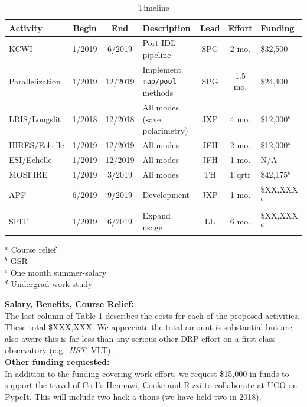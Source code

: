 \documentclass[12pt,preprint]{aastex}
\begin{document}
{\footnotesize

\begin{table}[ht]
\begin{center}
\caption{Timeline \label{tab:timeline}}
\end{center}
\begin{tabular}{lcclccl}
\hline 
Activity & Begin & End & Description & Lead & Effort & Funding \\
\hline 
KCWI & 1/2019 & 6/2019 & Port IDL pipeline & SPG & 2 mo. & \$32,500 \\
%
%
Parallelization & 1/2019 & 12/2019 & Implement {\tt map/pool} methods & SPG & 1.5 mo. & \$24,400 \\
LRIS/Longslit & 1/2018 & 12/2018 & All modes (save polarimetry) & JXP & 4 mo. & 
\$12,000$^a$ \\
HIRES/Echelle & 1/2019 & 12/2019 & All modes & JFH & 2 mo. & \$12,000$^a$ \\
ESI/Echelle & 1/2019 & 12/2019 & All modes & JFH & 1 mo. & N/A \\
MOSFIRE & 1/2019 & 3/2019 & All modes & TH & 1 qrtr & \$42,175$^b$\\
APF & 6/2019 & 9/2019 & Development & JXP & 1 mo. & \$XX,XXX$^c$ \\
SPIT & 1/2019 & 6/2019 & Expand usage & LL & 6 mo. & \$XX,XXX$^d$ \\
\hline 
\end{tabular} 
${}^a$ Course relief \\
${}^b$ GSR\\
${}^c$ One month summer-salary\\
${}^d$ Undergrad work-study\\
\end{table} 

}

\noindent
{\bf Salary, Benefits, Course Relief:} \\
The last column of Table 1 describes the costs
for each of the proposed activities.  These total
\$XXX,XXX.
We appreciate the total amount is substantial
but are also aware this is far less than any
serious other DRP effort on a first-class observatory
(e.g.\ {\it HST}, VLT).  \\

\noindent
{\bf Other funding requested:} \\
In addition to the funding covering work effort, we request
\$15,000 in funds to support the travel of Co-I's Hennawi,
Cooke and Rizzi to collaborate at UCO on PypeIt.  This will include
two hack-a-thons (we have held two in 2018).
\end{document}
